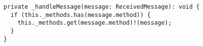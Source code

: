 \begin{verbatim}
  private _handleMessage(message: ReceivedMessage): void {
    if (this._methods.has(message.method)) {
      this._methods.get(message.method)!(message);
    }
  }
\end{verbatim}
